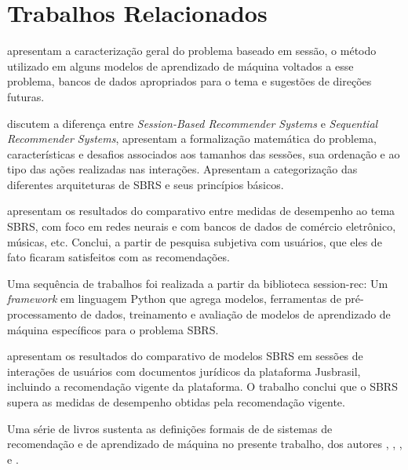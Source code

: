 \section{Trabalhos Relacionados}
\citet{rec_sys_handbook_2022} apresentam a caracterização geral do problema
baseado em sessão, o método utilizado em alguns modelos de aprendizado de
máquina voltados a esse problema, bancos de dados apropriados para o tema e
sugestões de direções futuras.

\citet{survey_wang_2021} discutem a diferença entre \textit{Session-Based Recommender Systems}
e \textit{Sequential Recommender Systems}, apresentam a formalização matemática
do problema, características e desafios associados aos tamanhos das sessões, sua
ordenação e ao tipo das ações realizadas nas interações. Apresentam a
categorização das diferentes arquiteturas de SBRS e seus princípios básicos.

\citet{ludewig2021empirical} apresentam os resultados do comparativo entre
medidas de desempenho ao tema SBRS, com foco em redes neurais e com bancos de
dados de comércio eletrônico, músicas, etc. Conclui, a partir de pesquisa subjetiva
com usuários, que eles de fato ficaram satisfeitos com as recomendações.

Uma sequência de trabalhos
\cite{LATIFI_2021,ludewig2021empirical,ludewig_2018,ludewig_2019,sessionrec} foi
realizada a partir da biblioteca session-rec: Um \textit{framework} em linguagem
Python que agrega modelos, ferramentas de pré-processamento de dados,
treinamento e avaliação de modelos de aprendizado de máquina específicos para o
problema SBRS.

 \citet{jusbrasil2022} apresentam os resultados do comparativo de modelos SBRS em
sessões de interações de usuários com documentos jurídicos da plataforma
Jusbrasil, incluindo a recomendação vigente da plataforma. O trabalho
conclui que o SBRS supera as medidas de desempenho obtidas pela recomendação
vigente.

Uma série de livros sustenta as definições formais de de sistemas de
recomendação e de aprendizado de máquina no presente trabalho, dos autores
\citet{pml1Book}, \citet{jannach2011recommender}, \citet{ricci2010introduction},
\citet{mitchell1997} e \citet{aggarwal2016recommender}.
